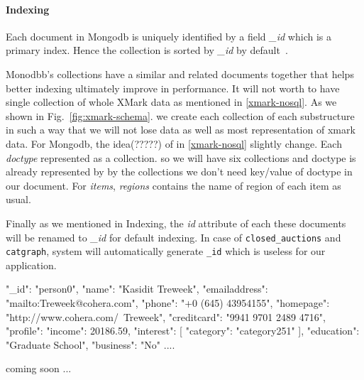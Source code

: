 \paragraph{Indexing} 
	Each document in Mongodb is uniquely identified by a field \textit{\_id} which is a primary index. Hence the collection is sorted by \textit{\_id} by default~\cite{nosql/comparision}. 
	

	
	

	Monodbb's collections have a similar and related documents together that helps better indexing ultimately improve in performance. It will not worth to have single collection of whole XMark data as mentioned in \ref{xmark-nosql}. As we shown in Fig.~\ref{fig:xmark-schema}. we create each collection of each substructure in such a way that we will not lose data as well as most representation of xmark data. For Mongodb, the idea(?????) of in \ref{xmark-nosql} slightly change. Each \textit{doctype} represented as a collection. so we will have six collections and doctype is already represented by by the collections we don't need key/value of doctype in our document. For \textit{items},  \textit{regions} contains the name of region of each item as usual. 
	
	Finally as we mentioned in Indexing, the \textit{id} attribute of each these documents will be renamed to \textit{\_id} for default indexing. In case of \texttt{closed\_auctions} and \texttt{catgraph}, system will automatically generate \texttt{\_id} which is useless for our application.
\label{code:mongodb-person0}
\begin{fakeJSON}[label=json123,caption=Mongodb data representation of XMARk data]
{
	"_id": "person0",
	"name": "Kasidit Treweek",
	"emailaddress": "mailto:Treweek@cohera.com",
	"phone": "+0 (645) 43954155",
	"homepage": "http://www.cohera.com/~Treweek",
	"creditcard": "9941 9701 2489 4716",
	"profile": {
		"income": 20186.59,
		"interest": [{
			"category": "category251"
		}],
		"education": "Graduate School",
		"business": "No"
	}
	....
}
\end{fakeJSON} 
	
	coming soon ...
	
	
